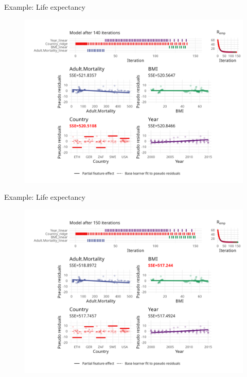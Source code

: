 \begin{frame}{Example: Life expectancy}
	\begin{figure}
		\centering
		\includegraphics[width=\textwidth]{figure/cwb-anim/fig-iter-0140.png}
	\end{figure}
	\addtocounter{framenumber}{-1}
\end{frame}


\begin{frame}{Example: Life expectancy}
	\begin{figure}
		\centering
		\includegraphics[width=\textwidth]{figure/cwb-anim/fig-iter-0150.png}
	\end{figure}
	\addtocounter{framenumber}{-1}
\end{frame}

